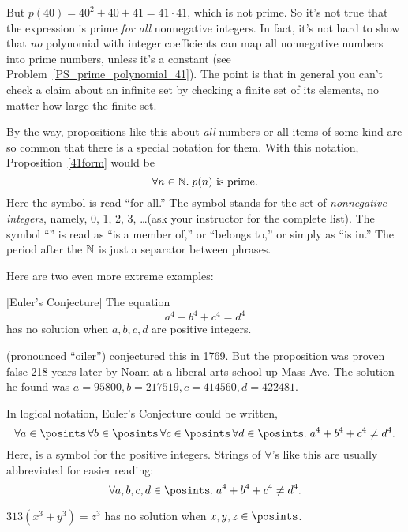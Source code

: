 But $p(40) = 40^2 + 40 + 41 = 41 \cdot 41$, which is not prime.  So
it's not true that the expression is prime \emph{for all} nonnegative
integers.  In fact, it's not hard to show that \emph{no} polynomial
with integer coefficients can map all nonnegative numbers into prime
numbers, unless it's a constant (see
Problem~\ref{PS_prime_polynomial_41}).  The point is that in general
you can't check a claim about an infinite set by checking a finite set
of its elements, no matter how large the finite set.

By the way, propositions like this about \emph{all} numbers or all items
of some kind are so common that there is a special notation for them.
With this notation, Proposition~\ref{41form} would be
\begin{equation}\label{pn}
\forall n \in \mathbb{N}.\; p(n) \text{ is prime}.
\end{equation}
Here the symbol \term{$\forall$} is read ``for all.''  The symbol
\term{$\naturals$} stands for the set of {\em nonnegative integers},
namely, 0, 1, 2, 3, \dots (ask your instructor for the complete list).
The symbol ``\term{$\in$}'' is read as ``is a member of,'' or
``belongs to,'' or simply as ``is in.''  The period after the
$\naturals$ is just a separator between phrases.

Here are two even more extreme examples:
\begin{proposition}\label{a4}[Euler's Conjecture]
The equation
\[
a^4 + b^4 + c^4 = d^4
\]
has no solution when $a, b, c, d$ are positive integers.
\end{proposition}
 (pronounced ``oiler'') conjectured this in 1769.  But the proposition
was proven false 218 years later by Noam  at a liberal arts school
up Mass Ave.  The solution he found was $a = 95800, b = 217519, c = 414560, d
= 422481$.

In logical notation, Euler's Conjecture \iffalse
Proposition~\ref{a4}\fi could be written,
\[
\forall a \in \posints\, \forall b \in \posints\, \forall c \in \posints\, \forall
d \in \posints.\; a^4 + b^4 + c^4 \neq d^4.
\]
Here, \term{$\posints$} is a symbol for the positive integers.
Strings of $\forall$'s like this are usually abbreviated for easier reading:
\[
\forall a, b, c, d \in \posints.\; a^4 + b^4 + c^4 \neq d^4.
\]

\begin{proposition}
$313 (x^3 + y^3) = z^3$ has no solution when $x, y, z\in\posints$.
\end{proposition}

